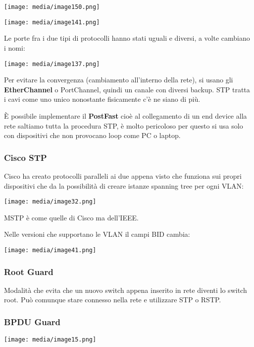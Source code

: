 \texttt{[image: media/image150.png]}

\texttt{[image: media/image141.png]}

Le porte fra i due tipi di protocolli hanno stati uguali e diversi, a
volte cambiano i nomi:

\texttt{[image: media/image137.png]}

Per evitare la convergenza (cambiamento all'interno della rete), si
usano gli \textbf{EtherChannel} o PortChannel, quindi un canale con
diversi backup. STP tratta i cavi come uno unico nonostante fisicamente
c'è ne siano di più.

È possibile implementare il \textbf{PostFast} cioè al collegamento di un
end device alla rete saltiamo tutta la procedura STP, è molto pericoloso
per questo si usa solo con dispositivi che non provocano loop come PC o
laptop.

\subsubsection{Cisco STP}\label{cisco-stp}

Cisco ha creato protocolli paralleli ai due appena visto che funziona
sui propri dispositivi che da la possibilità di creare istanze spanning
tree per ogni VLAN:

\texttt{[image: media/image32.png]}

MSTP è come quelle di Cisco ma dell'IEEE.

Nelle versioni che supportano le VLAN il campi BID cambia:

\texttt{[image: media/image41.png]}

\subsubsection{Root Guard}\label{root-guard}

Modalità che evita che un nuovo switch appena inserito in rete diventi
lo switch root. Può comunque stare connesso nella rete e utilizzare STP
o RSTP.

\subsubsection{BPDU Guard}\label{bpdu-guard}

\texttt{[image: media/image15.png]}

